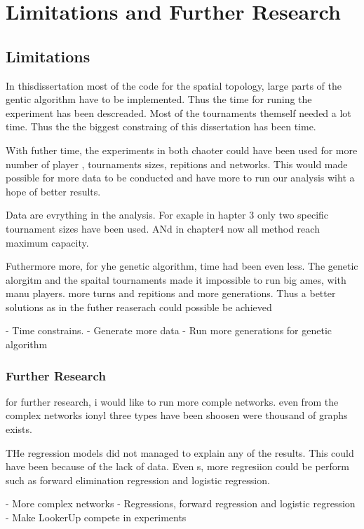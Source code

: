 \section{Limitations and Further Research}
\subsection{Limitations}

In thisdissertation most of the code for the spatial topology, large parts of the gentic algorithm
have to be implemented. Thus the time for runing the experiment has been descreaded.
Most of the tournaments themself needed a lot time. Thus the the biggest constraing
of this dissertation has been time.

With futher time, the experiments in both chaoter could have been used for
more number of player , tournaments sizes, repitions and networks. This would
made possible for more data to be conducted and have more to run our analysis
wiht a hope of better results.

Data are evrything in the analysis. For exaple in hapter 3 only two specific
tournament sizes have been used. ANd in chapter4 now all method reach maximum capacity.

Futhermore more, for yhe genetic algorithm, time had been even less. The genetic
alorgitm and the spaital tournaments made it impossible to run big ames, with
manu players. more turns and repitions and more generations. Thus a better solutions
as in the futher reaserach could possible be achieved

- Time constrains.
- Generate more data
- Run more generations for genetic algorithm
\subsubsection{Further Research}

for further research, i would like to run more comple networks. even from the complex
networks ionyl three types have been shoosen were thousand of graphs exists.

THe regression models did not managed to explain any of the results. This could have been
because of the lack of data. Even s, more regresiion could be perform such as
forward elimination regression and logistic regression.

- More complex networks
- Regressions, forward regression and logistic regression
- Make LookerUp compete in experiments
